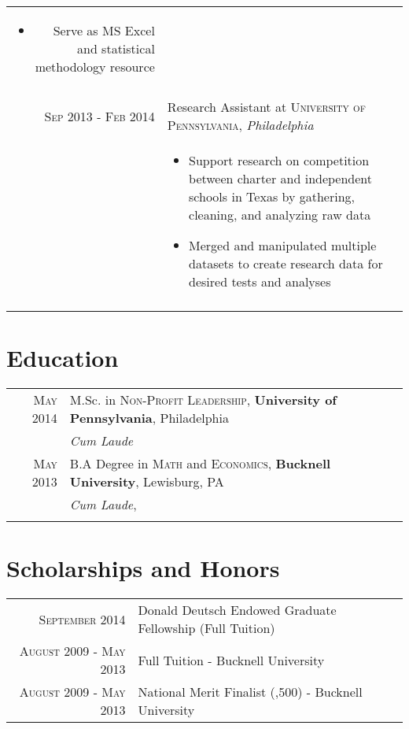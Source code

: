 \documentclass[a4paper,10pt]{article}
\begin{document}
\begin{tabular}{r|p{11cm}}
{\begin{itemize}
 		\item{Serve as MS Excel and statistical methodology resource}
 	\end{itemize}}\\\multicolumn{2}{c}{} \\	
\textsc{Sep 2013 - Feb 2014} & Research Assistant at \textsc{University of Pennsylvania}, \emph{Philadelphia}\\&\footnotesize{\begin{itemize}
		\item{Support research on competition between charter and independent schools in Texas by gathering, cleaning, and analyzing raw data}
		\item{Merged and manipulated multiple datasets to create research data for desired tests and analyses}
	\end{itemize}}\\\multicolumn{2}{c}{} \\	
\end{tabular}

\section{Education}
\begin{tabular}{rl}	
 \textsc{May} 2014 & M.Sc. in \textsc{Non-Profit Leadership}, \textbf{University of Pennsylvania}, Philadelphia\\
& \small\emph{Cum Laude} \\
\textsc{May} 2013& B.A Degree in \textsc{Math} and \textsc{Economics}, \normalsize\textbf{Bucknell University}, Lewisburg, PA \\& \small\emph{Cum Laude}, \\\\
\end{tabular}

\section{Scholarships and Honors}
\begin{tabular}{rl}
 \textsc{September} 2014 &Donald Deutsch Endowed Graduate Fellowship \footnotesize(Full Tuition)\normalsize\\
\textsc{August} 2009 - \textsc{May 2013} & Full Tuition - Bucknell University \\
\textsc{August} 2009 - \textsc{May 2013} & National Merit Finalist (\textdollar2,500) - Bucknell University
\end{tabular}
\\\\
\end{document}
